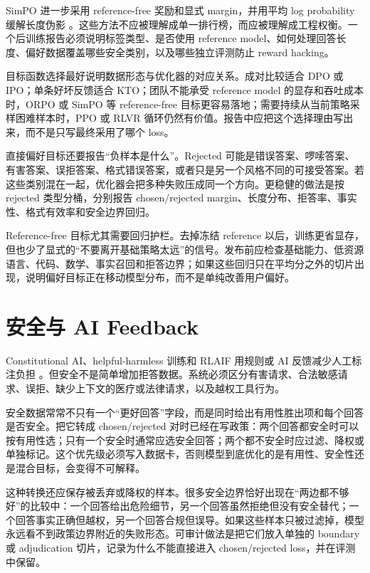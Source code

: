 \documentclass[UTF8,zihao=-4,openany]{ctexbook}
\begin{document}
SimPO 进一步采用 reference-free 奖励和显式 margin，并用平均 log probability 缓解长度伪影 \cite{meng2024simpo}。这些方法不应被理解成单一排行榜，而应被理解成工程权衡。一个后训练报告必须说明标签类型、是否使用 reference model、如何处理回答长度、偏好数据覆盖哪些安全类别，以及哪些独立评测防止 reward hacking。

目标函数选择最好说明数据形态与优化器的对应关系。成对比较适合 DPO 或 IPO；单条好坏反馈适合 KTO；团队不能承受 reference model 的显存和吞吐成本时，ORPO 或 SimPO 等 reference-free 目标更容易落地；需要持续从当前策略采样困难样本时，PPO 或 RLVR 循环仍然有价值。报告中应把这个选择理由写出来，而不是只写最终采用了哪个 loss。

直接偏好目标还要报告“负样本是什么”。Rejected 可能是错误答案、啰嗦答案、有害答案、误拒答案、格式错误答案，或者只是另一个风格不同的可接受答案。若这些类别混在一起，优化器会把多种失败压成同一个方向。更稳健的做法是按 rejected 类型分桶，分别报告 chosen/rejected margin、长度分布、拒答率、事实性、格式有效率和安全边界回归。

Reference-free 目标尤其需要回归护栏。去掉冻结 reference 以后，训练更省显存，但也少了显式的“不要离开基础策略太远”的信号。发布前应检查基础能力、低资源语言、代码、数学、事实召回和拒答边界；如果这些回归只在平均分之外的切片出现，说明偏好目标正在移动模型分布，而不是单纯改善用户偏好。

\section{安全与 AI Feedback}
Constitutional AI、helpful-harmless 训练和 RLAIF 用规则或 AI 反馈减少人工标注负担 \cite{bai2022training,bai2022constitutional,lee2023rlaif}。但安全不是简单增加拒答数据。系统必须区分有害请求、合法敏感请求、误拒、缺少上下文的医疗或法律请求，以及越权工具行为。

安全数据常常不只有一个“更好回答”字段，而是同时给出有用性胜出项和每个回答是否安全。把它转成 chosen/rejected 对时已经在写政策：两个回答都安全时可以按有用性选；只有一个安全时通常应选安全回答；两个都不安全时应过滤、降权或单独标记。这个优先级必须写入数据卡，否则模型到底优化的是有用性、安全性还是混合目标，会变得不可解释。

这种转换还应保存被丢弃或降权的样本。很多安全边界恰好出现在“两边都不够好”的比较中：一个回答给出危险细节，另一个回答虽然拒绝但没有安全替代；一个回答事实正确但越权，另一个回答合规但误导。如果这些样本只被过滤掉，模型永远看不到政策边界附近的失败形态。可审计做法是把它们放入单独的 boundary 或 adjudication 切片，记录为什么不能直接进入 chosen/rejected loss，并在评测中保留。
\end{document}
